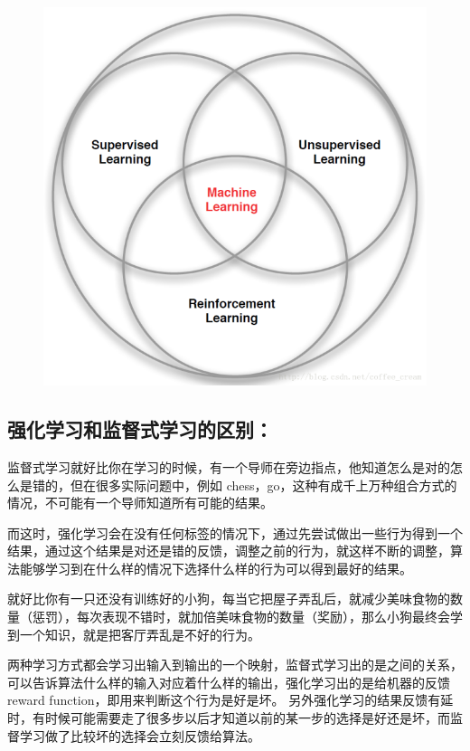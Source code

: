 \begin{figure}
\centering
\includegraphics{./img/ch10/10-3.png}
\caption{}
\end{figure}

\subsection{强化学习和监督式学习的区别：}\label{ux5f3aux5316ux5b66ux4e60ux548cux76d1ux7763ux5f0fux5b66ux4e60ux7684ux533aux522b}

监督式学习就好比你在学习的时候，有一个导师在旁边指点，他知道怎么是对的怎么是错的，但在很多实际问题中，例如
chess，go，这种有成千上万种组合方式的情况，不可能有一个导师知道所有可能的结果。

而这时，强化学习会在没有任何标签的情况下，通过先尝试做出一些行为得到一个结果，通过这个结果是对还是错的反馈，调整之前的行为，就这样不断的调整，算法能够学习到在什么样的情况下选择什么样的行为可以得到最好的结果。

就好比你有一只还没有训练好的小狗，每当它把屋子弄乱后，就减少美味食物的数量（惩罚），每次表现不错时，就加倍美味食物的数量（奖励），那么小狗最终会学到一个知识，就是把客厅弄乱是不好的行为。

两种学习方式都会学习出输入到输出的一个映射，监督式学习出的是之间的关系，可以告诉算法什么样的输入对应着什么样的输出，强化学习出的是给机器的反馈
reward function，即用来判断这个行为是好是坏。
另外强化学习的结果反馈有延时，有时候可能需要走了很多步以后才知道以前的某一步的选择是好还是坏，而监督学习做了比较坏的选择会立刻反馈给算法。

